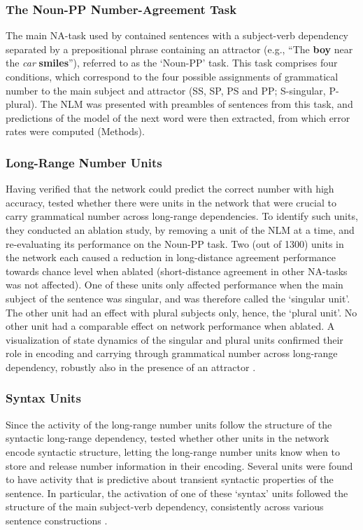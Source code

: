 \subsubsection{The Noun-PP Number-Agreement Task}
The main NA-task used by \citet{lakretz2019emergence} contained sentences with a subject-verb dependency separated by a prepositional phrase containing an attractor (e.g., ``The \textbf{boy} near the \emph{car} \textbf{smiles}''), referred to as the `Noun-PP' task. This task comprises four conditions, which correspond to the four possible assignments of grammatical number to the main subject and attractor (SS, SP, PS and PP; S-singular, P-plural). The NLM was presented with preambles of sentences from this task, and predictions of the model of the next word were then extracted, from which error rates were computed (Methods). 

\subsubsection{Long-Range Number Units}
Having verified that the network could predict the correct number with high accuracy, \citet{lakretz2019emergence} tested whether there were units in the network that were crucial to carry grammatical number across long-range dependencies.  To identify such units, they conducted an ablation study, by removing a unit of the NLM at a time, and re-evaluating its performance on the Noun-PP task. Two (out of 1300) units in the network each caused a reduction in long-distance agreement performance towards chance level when ablated (short-distance agreement in other NA-tasks was not affected). One of these units only affected performance when the main subject of the sentence was singular, and was therefore called the `singular unit'. The other unit had an effect with plural subjects only, hence, the `plural unit'. 
No other unit had a comparable effect on network performance when ablated. A visualization of state dynamics of the singular and plural units confirmed their role in encoding and carrying through grammatical number across long-range dependency, robustly also in the presence of an attractor \citep[figure 1 in][]{lakretz2019emergence}.

\subsubsection{Syntax Units}
Since the activity of the long-range number units follow the structure of the syntactic long-range dependency, \citet{lakretz2019emergence} tested whether other units in the network encode syntactic structure, letting the long-range number units know when to store and release number information in their encoding. Several units were found to have activity that is predictive about transient syntactic properties of the sentence. In particular, the activation of one of these `syntax' units followed the structure of the main subject-verb dependency, consistently across various sentence constructions \citep[figure 3 in][]{lakretz2019emergence}. 

